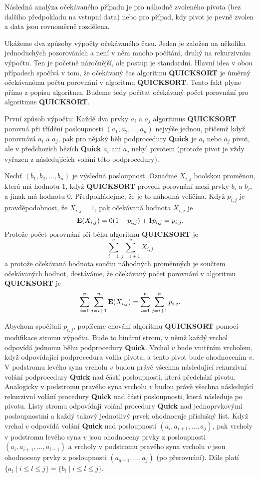 \documentclass[a4paper,12pt]{article}
\begin{document}
Následná analý\-za očekávaného případu  
je pro ná\-hod\-ně zvoleného pivota (bez dalšího před\-pokladu na 
vstupní data) nebo pro případ, kdy pivot je pevně zvolen a data jsou 
rovno\-měrně rozdě\-lena.

Ukážeme dva způsoby výpočty očekávaného času.  Jeden 
je založen na několika jednoduchých pozorováních a není v 
něm mnoho počítání, druhý na rekurzivním výpočtu. Ten 
je početně náročnější, ale postup je standardní. Hlavní idea v obou 
případech spočívá v tom, že  
očekávaný čas algoritmu {\bf QUICKSORT} je úměrný 
očekávanému počtu porovnání v algoritmu {\bf QUICKSORT}.
Tento fakt plyne přímo z popisu algoritmu.  Budeme 
tedy počítat  
očeká\-vaný počet porovnání pro algoritmus {\bf QUICKSORT}.  

První způsob výpočtu:\newline 
Každé dva prvky $a_i$ a $a_j$ algoritmus {\bf QUICKSORT} porovná 
při třídění posloupnosti $(a_1,a_2,\dots,a_n)$ nejvýše jednou, 
přičemž když porovnává $a_i$ a $a_j$, 
pak pro nějaký běh podprocedury {\bf Quick} je $a_i$ nebo $
a_j$ 
pivot, ale v předchozích bězích {\bf Quick} $a_i$ ani $
a_j$ 
nebyl pivotem (protože pivot je vždy vyřazen z následujících 
volání této podprocedury).

Nechť $(b_1,b_2,\dots,b_n)$ je výsledná posloupnost.  
Označme $X_{i,j}$ boolskou proměnou, která má hodnotu $
1$, 
když {\bf QUICKSORT} provedl porovnání mezi prvky $b_i$ a $
b_j$, a 
jinak má hodnotu $0$.  Předpokládejme, že je to náhodná 
veličina. Když $p_{i,j}$ je prav\-dě\-podobnost, že $
X_{i,j}=1$, 
pak očekávaná hodnota $X_{i,j}$ je 
$$\bold E(X_{i,j})=0(1-p_{i,j})+1p_{i,j}=p_{i,j}.$$
Protože počet porovnání  při běhu algoritmu {\bf QUICKSORT} je
$$\sum_{i=1}^n\sum_{j=i+1}^nX_{i,j}$$
a protože očekávaná hodnota součtu náhodných 
proměnných je součtem očekávaných hodnot, dostáváme, že 
očekávaný počet porovnání v algoritmu {\bf QUICKSORT} je
$$\sum_{i=1}^n\sum_{j=i+1}^n\bold E(X_{i,j})=\sum_{i=1}^n\sum_{j=
i+1}^np_{i,j}.$$

Abychom spočítali $p_{i,j}$, popíšeme chování algoritmu 
{\bf QUICKSORT} pomocí modifikace stromu výpočtu. Bude to binární 
strom, v němž každý vrchol odpovídá jednomu 
běhu podprocedury {\bf Quick}. Vrchol $v$ bude vnitřním 
vrcholem, 
když odpovída\-jí\-cí podprocedura volila pivota, a tento 
pivot bude ohodnocením $v$. V podstromu levého syna vrcholu $
v$
budou právě všechna následující rekurzivní volání podprocedury 
{\bf Quick} nad částí posloupnosti, která předchází pivotu. 
Analogicky v podstromu 
pravého syna vrcholu $v$ budou právě všechna následující 
rekurzivní volání procedury {\bf Quick} nad částí 
posloupnosti, která následuje po pivotu. 
Listy stromu odpovídají volání procedury {\bf Quick} nad 
jednoprvkovými posloupnost\-mi a každý takový jednotlivý 
prvek ohodnocuje příslušný  
list. Když vrchol $v$ odpovídá volání {\bf Quick} nad posloupností 
$(a_i,a_{i+1},\dots,a_j)$, pak vrcholy v podstromu levého syna $
v$ jsou 
ohodnoceny prvky z posloupnosti $(a_i,a_{i+1},\dots,a_{l-1})$ a vrcholy v 
podstromu pravého syna vrcholu $v$ jsou ohodnoceny prvky z posloupnosti 
$(a_{q+1},\dots,a_j)$ (po přerovnání).
Dále platí $\{a_l\mid i\le l\le j\}=\{b_l\mid i\le l\le j\}$.
\end{document}
